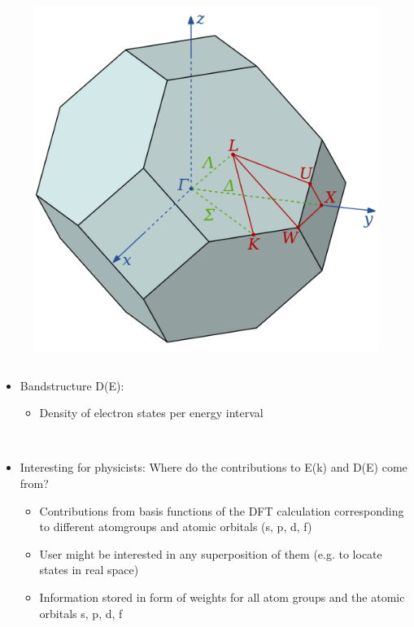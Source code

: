 \begin{frame}
\begin{column}{.5\textwidth}
\end{column}
\begin{column}{.5\textwidth}
\begin{figure}
   \includegraphics[width=0.7\linewidth]{fig/Brillouin_Zone_(1st,_FCC).png}
\end{figure}

\end{column}



\end{frame}

\begin{frame}
\begin{itemize}
\item Bandstructure D(E):
\begin{itemize}
    \item Density of electron states per energy interval %
\end{itemize}

\
\item Interesting for physicists: Where do the contributions to E(k) and D(E) come from?
\begin{itemize}
\item Contributions from basis functions of the DFT calculation corresponding to different atomgroups and atomic orbitals (s, p, d, f)
\item User might be interested in any superposition of them (e.g. to locate states in real space)
\item Information stored in form of weights for all atom groups and the atomic orbitals s, p, d, f 
\end{itemize}

\end{itemize}
\end{frame}